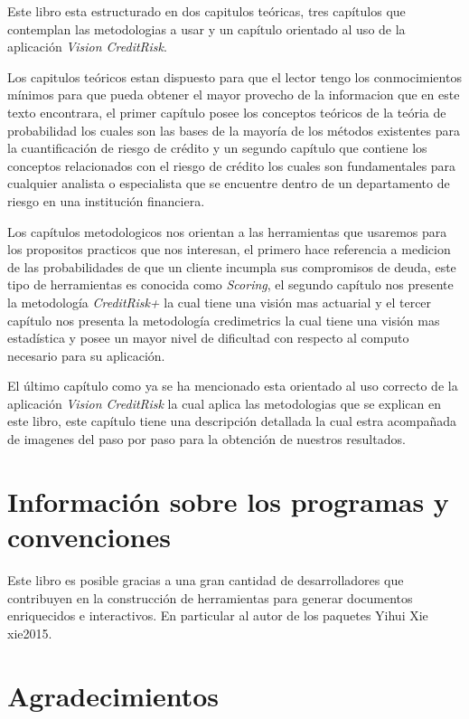 \documentclass[
  12pt,
]{krantz}
\theoremstyle{definition}
\theoremstyle{definition}
\theoremstyle{definition}
\theoremstyle{remark}
\begin{document}
Este libro esta estructurado en dos capitulos teóricas, tres capítulos que contemplan las metodologias a usar y un capítulo orientado al uso de la aplicación \emph{Vision CreditRisk}.

Los capitulos teóricos estan dispuesto para que el lector tengo los conmocimientos mínimos para que pueda obtener el mayor provecho de la informacion que en este texto encontrara, el primer capítulo posee los conceptos teóricos de la teória de probabilidad los cuales son las bases de la mayoría de los métodos existentes para la cuantificación de riesgo de crédito y un segundo capítulo que contiene los conceptos relacionados con el riesgo de crédito los cuales son fundamentales para cualquier analista o especialista que se encuentre dentro de un departamento de riesgo en una institución financiera.

Los capítulos metodologicos nos orientan a las herramientas que usaremos para los propositos practicos que nos interesan, el primero hace referencia a medicion de las probabilidades de que un cliente incumpla sus compromisos de deuda, este tipo de herramientas es conocida como \emph{Scoring}, el segundo capítulo nos presente la metodología \emph{CreditRisk+} la cual tiene una visión mas actuarial y el tercer capítulo nos presenta la metodología credimetrics la cual tiene una visión mas estadística y posee un mayor nivel de dificultad con respecto al computo necesario para su aplicación.

El último capítulo como ya se ha mencionado esta orientado al uso correcto de la aplicación \emph{Vision CreditRisk} la cual aplica las metodologias que se explican en este libro, este capítulo tiene una descripción detallada la cual estra acompañada de imagenes del paso por paso para la obtención de nuestros resultados.

\hypertarget{informacion-sobre-los-programas-y-convenciones}{%
\section*{Información sobre los programas y convenciones}\label{informacion-sobre-los-programas-y-convenciones}}


Este libro es posible gracias a una gran cantidad de desarrolladores que contribuyen en la construcción de herramientas para generar documentos enriquecidos e interactivos. En particular al autor de los paquetes Yihui Xie xie2015.

\hypertarget{agradecimientos}{%
\section*{Agradecimientos}\label{agradecimientos}}
\end{document}

